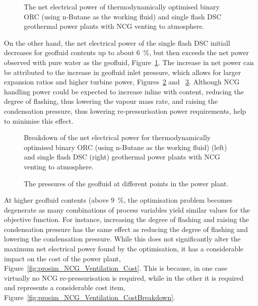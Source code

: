         \begin{figure}[H]
            \centering
            
            \caption[The net electrical power of a thermodynamically optimised binary \ac{ORC} and single flash \ac{DSC} geothermal power plants venting \ac{NCG} to atmosphere.]{The net electrical power of thermodynamically optimised binary \ac{ORC} (using n-Butane as the working fluid) and single flash \ac{DSC} geothermal power plants with \ac{NCG} venting to atmosphere.}
            \label{fig:prosim_NCG_Ventilation_Wnet}
        \end{figure}

        On the other hand, the net electrical power of the single flash \ac{DSC} initiall decreases for geofluid  contents up to about \qty{6}{\percent}, but then exceeds the net power observed with pure water as the geofluid, Figure~\ref{fig:prosim_NCG_Ventilation_Wnet}. The increase in net power can be attributed to the increase in geofluid inlet pressure, which allows for larger expansion ratios and higher turbine power, Figures~\ref{fig:prosim_NCG_Ventilation_Power_Breakdown} and ~\ref{fig:prosim_NCG_Ventilation_OPs}. Although \ac{NCG} handling power could be expected to increase inline with  content, reducing the degree of flashing, thus lowering the vapour mass rate, and raising the condensation pressure, thus lowering re-pressurisation power requirements, help to minimise this effect.

        \begin{figure}[H]
            \centering
            
            \caption{Breakdown of the net electrical power for thermodynamically optimised binary \ac{ORC} (using n-Butane as the working fluid) (left) and single flash \ac{DSC} (right) geothermal power plants with \ac{NCG} venting to atmosphere.}
            \label{fig:prosim_NCG_Ventilation_Power_Breakdown}
        \end{figure}

        \begin{figure}[H]
            \centering
            
            \caption{The pressures of the geofluid at different points in the power plant.}
            \label{fig:prosim_NCG_Ventilation_OPs}
        \end{figure}

        At higher geofluid  contents (above \qty{9}{\percent}, the optimisation problem becomes degenerate as many combinations of process variables yield similar values for the objective function. For instance, increasing the degree of flashing and raising the condensation pressure has the same effect as reducing the degree of flashing and lowering the condensation pressure. While this does not significantly alter the maximum net electrical power found by the optimisation, it has a considerable impact on the cost of the power plant, Figure~\ref{fig:prosim_NCG_Ventilation_Cost}. This is because, in one case virtually no \ac{NCG} re-pressurisation is required, while in the other it is required and represents a considerable cost item, Figure~\ref{fig:prosim_NCG_Ventilation_CostBreakdown}.


